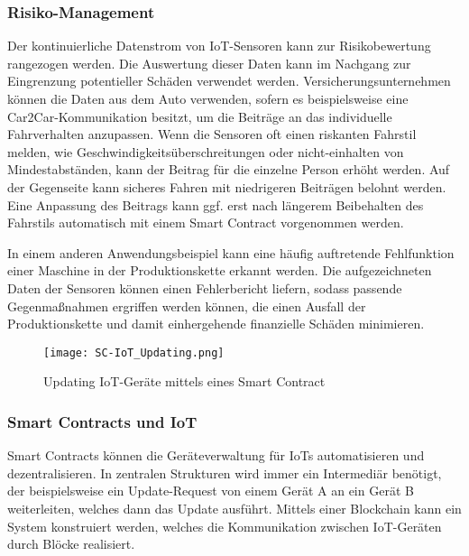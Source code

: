 \subsubsection{Risiko-Management}
Der kontinuierliche Datenstrom von IoT-Sensoren kann zur Risikobewertung rangezogen werden.
Die Auswertung dieser Daten kann im Nachgang zur Eingrenzung potentieller Schäden 
verwendet werden.
Versicherungsunternehmen können die Daten aus dem Auto verwenden, sofern es beispielsweise
eine Car2Car-Kommunikation besitzt, um die Beiträge an das individuelle Fahrverhalten
anzupassen. 
Wenn die Sensoren oft einen riskanten Fahrstil melden, wie Geschwindigkeitsüberschreitungen oder 
nicht-einhalten von Mindestabständen, kann der Beitrag für die einzelne Person erhöht werden. Auf der 
Gegenseite kann sicheres Fahren mit niedrigeren Beiträgen belohnt werden.
\cite[p.~169f]{chowdhary2025smart}
Eine Anpassung des Beitrags kann ggf. erst nach längerem Beibehalten des Fahrstils automatisch mit einem 
Smart Contract vorgenommen werden.

In einem anderen Anwendungsbeispiel kann eine häufig auftretende Fehlfunktion einer Maschine in der 
Produktionskette erkannt werden. Die aufgezeichneten Daten der Sensoren können einen Fehlerbericht liefern, 
sodass passende Gegenmaßnahmen ergriffen werden können, die einen Ausfall der Produktionskette und damit 
einhergehende finanzielle Schäden minimieren.




\begin{figure}[h]
    \begin{center}
        \texttt{[image: SC-IoT\_Updating.png]}
    \end{center}
    \caption{Updating IoT-Geräte mittels eines Smart Contract}
    \label{fig:SC-IoT_Update}
\end{figure}

\subsubsection{Smart Contracts und IoT}
Smart Contracts können die Geräteverwaltung für IoTs automatisieren und dezentralisieren. 
In zentralen Strukturen wird immer ein Intermediär benötigt, der beispielsweise ein Update-Request von einem
Gerät A an ein Gerät B weiterleiten, welches dann das Update ausführt.
Mittels einer Blockchain kann ein System konstruiert werden, welches die Kommunikation zwischen IoT-Geräten
durch Blöcke realisiert.

